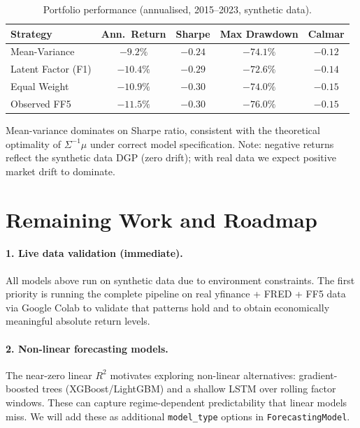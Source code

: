 \documentclass{article}
\begin{document}
\begin{table}[h]
\centering
\caption{Portfolio performance (annualised, 2015--2023, synthetic data).}
\label{tab:port}
\begin{tabular}{lcccc}
\toprule
Strategy & Ann.\ Return & Sharpe & Max Drawdown & Calmar \\
\midrule
Mean-Variance     & $-9.2\%$ & $-0.24$ & $-74.1\%$ & $-0.12$ \\
Latent Factor (F1) & $-10.4\%$ & $-0.29$ & $-72.6\%$ & $-0.14$ \\
Equal Weight      & $-10.9\%$ & $-0.30$ & $-74.0\%$ & $-0.15$ \\
Observed FF5      & $-11.5\%$ & $-0.30$ & $-76.0\%$ & $-0.15$ \\
\bottomrule
\end{tabular}
\end{table}

Mean-variance dominates on Sharpe ratio, consistent with the theoretical optimality of $\Sigma^{-1}\mu$
under correct model specification. Note: negative returns reflect the synthetic data DGP (zero
drift); with real data we expect positive market drift to dominate.

\section{Remaining Work and Roadmap}

\paragraph{1. Live data validation (immediate).}
All models above run on synthetic data due to environment constraints. The first priority is running
the complete pipeline on real yfinance + FRED + FF5 data via Google Colab to validate that patterns
hold and to obtain economically meaningful absolute return levels.

\paragraph{2. Non-linear forecasting models.}
The near-zero linear $R^2$ motivates exploring non-linear alternatives: gradient-boosted trees
(XGBoost/LightGBM) and a shallow LSTM over rolling factor windows. These can capture regime-dependent
predictability that linear models miss. We will add these as additional \texttt{model\_type} options
in \texttt{ForecastingModel}.
\end{document}
